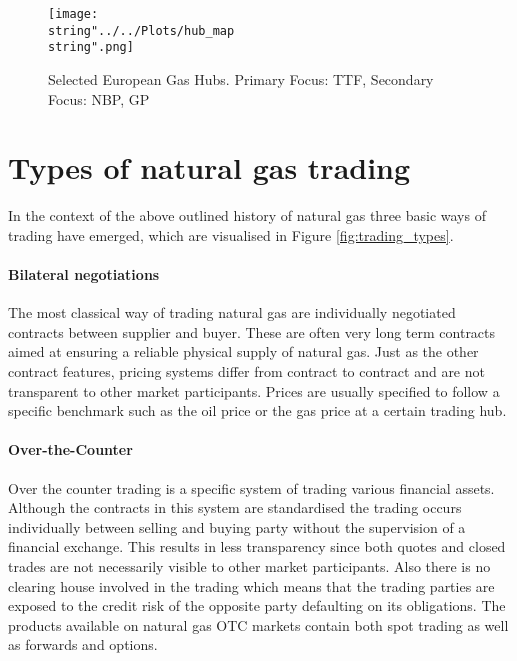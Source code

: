 \begin{figure}[H]
  \centering
\texttt{[image: \\string"../../Plots/hub\_map\\string".png]}
  \caption{Selected European Gas Hubs. Primary Focus: TTF, Secondary Focus: NBP, GP}\label{fig:hub_map}
\end{figure}

\section{Types of natural gas trading}
In the context of the above outlined history of natural gas three basic ways of trading have emerged, which are visualised in Figure \ref{fig:trading_types}.

\paragraph{Bilateral negotiations}
The most classical way of trading natural gas are individually negotiated contracts between supplier and buyer. These are often very long term contracts aimed at ensuring a reliable physical supply of natural gas. Just as the other contract features, pricing systems differ from contract to contract and are not transparent to other market participants. Prices are usually specified to follow a specific benchmark such as the oil price or the gas price at a certain trading hub. 

\paragraph{Over-the-Counter}
Over the counter trading is a specific system of trading various financial assets. Although the contracts in this system are standardised the trading occurs individually between selling and buying party without the supervision of a financial exchange. This results in less transparency since both quotes and closed trades are not necessarily visible to other market participants. Also there is no clearing house involved in the trading which means that the trading parties are exposed to the credit risk of the opposite party defaulting on its obligations. The products available on natural gas OTC markets contain both spot trading as well as forwards and options.

